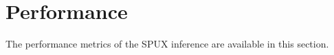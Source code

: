 \section{Performance}

The performance metrics of the SPUX inference are available in this section.



